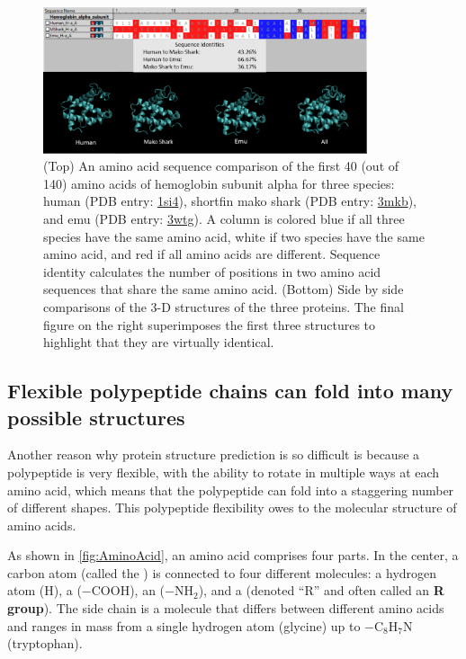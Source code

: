 \begin{figure}[h]
	\centering
	\mySfFamily
	\includegraphics[width = 0.85\textwidth]{../images/SequenceStructureExample.png}
	\caption{(Top) An amino acid sequence comparison of the first 40 (out of 140) amino acids of hemoglobin subunit alpha for three species: human (PDB entry: \href{https://www.rcsb.org/structure/1si4}{1si4}), shortfin mako shark (PDB entry: \href{https://www.rcsb.org/structure/3mkb}{3mkb}), and emu (PDB entry: \href{https://www.rcsb.org/structure/3wtg}{3wtg}). A column is colored blue if all three species have the same amino acid, white if two species have the same amino acid, and red if all amino acids are different. Sequence identity calculates the number of positions in two amino acid sequences that share the same amino acid. (Bottom) Side by side comparisons of the 3-D structures of the three proteins. The final figure on the right superimposes the first three structures to highlight that they are virtually identical.}
	\label{fig:SequenceStructureExample}
\end{figure}

\subsection{Flexible polypeptide chains can fold into many possible structures}

Another reason why protein structure prediction is so difficult is because a polypeptide is very flexible, with the ability to rotate in multiple ways at each amino acid, which means that the polypeptide can fold into a staggering number of different shapes. This polypeptide flexibility owes to the molecular structure of amino acids.

As shown in \autoref{fig:AminoAcid}, an amino acid comprises four parts. In the center, a carbon atom (called the ) is connected to four different molecules: a hydrogen atom (H), a  ($-\text{COOH}$), an  ($-\text{NH}_2$), and a  (denoted ``R'' and often called an \textbf{R group}). The side chain is a molecule that differs between different amino acids and ranges in mass from a single hydrogen atom (glycine) up to $-\text{C}_8\text{H}_7\text{N}$ (tryptophan).

